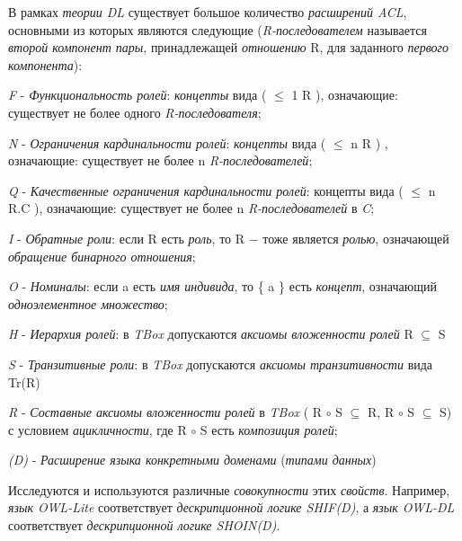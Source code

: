 {В рамках \textit{теории DL} существует большое количество \textit{расширений ACL}, основными из которых являются следующие (\textit{R-последователем} называется \textit{второй компонент пары}, принадлежащей \textit{отношению} R, для заданного \textit{первого компонента}):
\begin{scnitemize}
\item \textit{F} - \textit{Функциональность ролей}: \textit{концепты} вида ( \(\leq\) 1 R ), означающие: существует не более одного \textit{R-последователя};
\item \textit{N} - \textit{Ограничения кардинальности ролей}: \textit{концепты} вида ( \(\leq\) n R ) , означающие: существует не более n \textit{R-последователей};
\item \textit{Q} - \textit{Качественные ограничения кардинальности ролей}: концепты вида ( \(\leq\) n R.C ), означающие: существует не более n \textit{R-последователей} в \textit{C};    
\item \textit{I} - \textit{Обратные роли}: если R есть \textit{роль}, то R − тоже является \textit{ролью}, означающей \textit{обращение бинарного отношения};
\item \textit{O} - \textit{Номиналы}: если a есть \textit{имя индивида}, то \{ a \} есть \textit{концепт}, означающий \textit{одноэлементное множество};
\item \textit{H} - \textit{Иерархия ролей}: в \textit{TBox} допускаются \textit{аксиомы вложенности ролей}    R \(\subseteq\) S
\item \textit{S} - \textit{Транзитивные роли}: в \textit{TBox} допускаются \textit{аксиомы транзитивности} вида Tr(R)
\item \textit{R} - \textit{Составные аксиомы вложенности ролей} в \textit{TBox} ( R \(\circ\) S \(\subseteq\) R, R \(\circ\) S \(\subseteq\) S) с условием \textit{ацикличности}, где R \(\circ\) S есть \textit{композиция ролей};
\item \textit{(D)} - \textit{Расширение языка конкретными доменами} (\textit{типами данных})
\end{scnitemize}

Исследуются и используются различные \textit{совокупности} этих \textit{свойств}. Например, \textit{язык OWL-Lite} соответствует \textit{дескрипционной логике SHIF(D)}, а \textit{язык OWL-DL} соответствует \textit{дескрипционной логике SHOIN(D)}.}



